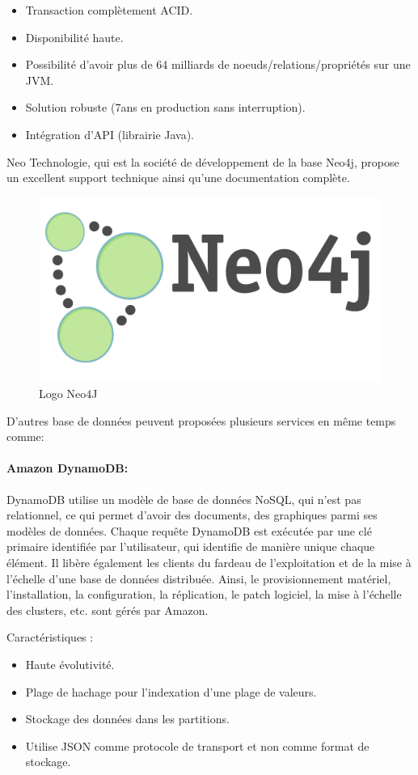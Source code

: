 \begin{itemize}[label=]
\item Transaction complètement ACID.
\item Disponibilité haute.
\item Possibilité d’avoir plus de 64 milliards de noeuds/relations/propriétés sur une JVM.
\item Solution robuste (7ans en production sans interruption).
\item Intégration d’API (librairie Java).
\end{itemize}

Neo Technologie, qui est la société de développement de la base Neo4j, propose un excellent support technique ainsi qu’une documentation complète.

\begin{figure}[h]
	\centering
    \includegraphics[scale=0.3]{img/4.12}
    \caption{Logo Neo4J}
\end{figure}

\newpage 
\begin{center}
\color[rgb]{0.2, 0.6, 0.2} D'autres base de données peuvent proposées plusieurs services en même temps comme: 
\end{center} 

\paragraph{Amazon DynamoDB:}
DynamoDB utilise un modèle de base de données NoSQL, qui n'est pas relationnel, ce qui permet d'avoir des documents, des graphiques parmi ses modèles de données.  Chaque requête DynamoDB est exécutée par une clé primaire identifiée par l'utilisateur, qui identifie de manière unique chaque élément. Il libère également les clients du fardeau de l'exploitation et de la mise à l'échelle d'une base de données distribuée. Ainsi, le provisionnement matériel, l'installation, la configuration, la réplication, le patch logiciel, la mise à l'échelle des clusters, etc. sont gérés par Amazon.

Caractéristiques :
\begin{itemize}[label=]
\item Haute évolutivité.
\item Plage de hachage pour l'indexation d'une plage de valeurs.
\item Stockage des données dans les partitions.
\item Utilise JSON comme protocole de transport et non comme format de stockage.
\end{itemize}